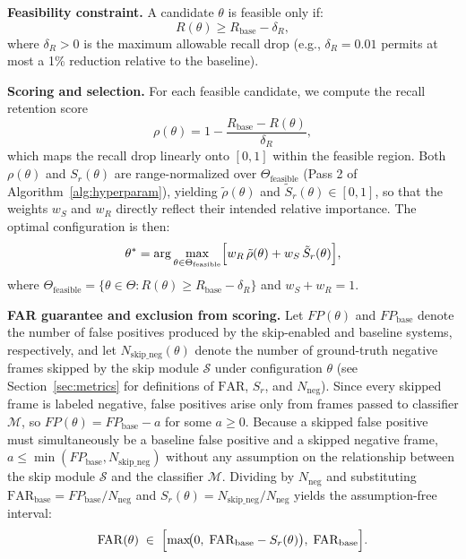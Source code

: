 \documentclass[final,3p,times,twocolumn]{elsarticle}
\begin{document}
\textbf{Feasibility constraint.} A candidate $\theta$ is feasible only
if:
\begin{equation}
R(\theta) \geq R_{\text{base}} - \delta_R,
\end{equation}
where $\delta_R > 0$ is the maximum allowable recall drop (e.g.,
$\delta_R = 0.01$ permits at most a 1\% reduction relative to the
baseline).

\textbf{Scoring and selection.} For each feasible candidate, we compute
the recall retention score
\begin{equation}\label{eq:rho}
\rho(\theta) = 1 - \frac{R_{\text{base}} - R(\theta)}{\delta_R},
\end{equation}
which maps the recall drop linearly onto $[0,1]$ within the feasible
region. Both $\rho(\theta)$ and $S_r(\theta)$ are range-normalized over
$\Theta_{\text{feasible}}$ (Pass 2 of Algorithm~\ref{alg:hyperparam}),
yielding $\tilde{\rho}(\theta)$ and $\tilde{S}_r(\theta) \in [0,1]$, so
that the weights $w_S$ and $w_R$ directly reflect their intended
relative importance. The optimal configuration is then:
\begin{equation}
\theta^*
= \arg\max_{\theta \in \Theta_{\text{feasible}}}
\Bigl[ w_R\,\tilde{\rho}(\theta) + w_S\,\tilde{S}_r(\theta) \Bigr],
\end{equation}
where $\Theta_{\text{feasible}} = \{\theta \in \Theta : R(\theta) \geq
R_{\text{base}} - \delta_R\}$ and $w_S + w_R = 1$.

\textbf{FAR guarantee and exclusion from scoring.} Let $FP(\theta)$ and
$FP_{\text{base}}$ denote the number of false positives produced by the
skip-enabled and baseline systems, respectively, and let
$N_{\text{skip\_neg}}(\theta)$ denote the number of ground-truth
negative frames skipped by the skip module $\mathcal{S}$ under
configuration $\theta$ (see Section~\ref{sec:metrics} for definitions of
$\mathrm{FAR}$, $S_r$, and $N_{\text{neg}}$). Since every skipped frame
is labeled negative, false positives arise only from frames passed to
classifier $\mathcal{M}$, so $FP(\theta) = FP_{\text{base}} - a$ for some
$a \geq 0$. Because a skipped false positive must simultaneously be a
baseline false positive and a skipped negative frame,
$a \leq \min(FP_{\text{base}}, N_{\text{skip\_neg}})$ without any
assumption on the relationship between the skip module $\mathcal{S}$ and
the classifier $\mathcal{M}$. Dividing by $N_{\text{neg}}$ and
substituting $\mathrm{FAR}_{\text{base}} = FP_{\text{base}}/N_{\text{neg}}$
and $S_r(\theta) = N_{\text{skip\_neg}}/N_{\text{neg}}$ yields the
assumption-free interval:
\begin{equation}\label{eq:far_interval}
\mathrm{FAR}(\theta) \;\in\;
\Bigl[\max\!\bigl(0,\;\mathrm{FAR}_{\text{base}} - S_r(\theta)\bigr),\;
\mathrm{FAR}_{\text{base}}\Bigr].
\end{equation}
\end{document}
